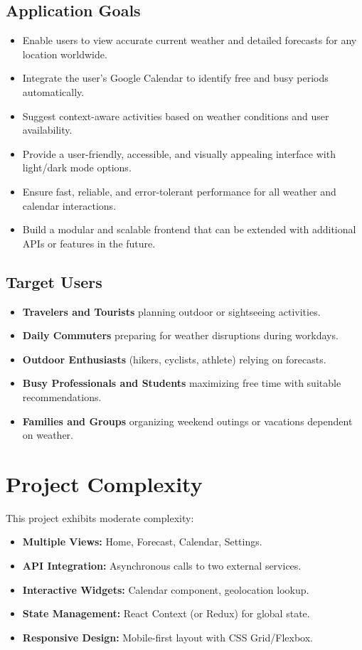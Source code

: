 \documentclass[fontsize=13pt,a4paper]{scrartcl}
\begin{document}
\subsection{Application Goals}
\begin{itemize}[nosep]
  \item Enable users to view accurate current weather and detailed forecasts for any location worldwide.
  \item Integrate the user’s Google Calendar to identify free and busy periods automatically.
  \item Suggest context-aware activities based on weather conditions and user availability.
  \item Provide a user-friendly, accessible, and visually appealing interface with light/dark mode options.
  \item Ensure fast, reliable, and error-tolerant performance for all weather and calendar interactions.
  \item Build a modular and scalable frontend that can be extended with additional APIs or features in the future.
\end{itemize}

\subsection{Target Users}
\begin{itemize}[nosep]
  \item \textbf{Travelers and Tourists} planning outdoor or sightseeing activities.
  \item \textbf{Daily Commuters} preparing for weather disruptions during workdays.
  \item \textbf{Outdoor Enthusiasts} (hikers, cyclists, athlete) relying on forecasts.
  \item \textbf{Busy Professionals and Students} maximizing free time with suitable recommendations.
  \item \textbf{Families and Groups} organizing weekend outings or vacations dependent on weather.
\end{itemize}

\newpage

\section{Project Complexity}
This project exhibits moderate complexity:
\begin{itemize}[nosep]
  \item \textbf{Multiple Views:} Home, Forecast, Calendar, Settings.
  \item \textbf{API Integration:} Asynchronous calls to two external services.
  \item \textbf{Interactive Widgets:} Calendar component, geolocation lookup.
  \item \textbf{State Management:} React Context (or Redux) for global state.
  \item \textbf{Responsive Design:} Mobile-first layout with CSS Grid/Flexbox.
\end{itemize}
\end{document}
